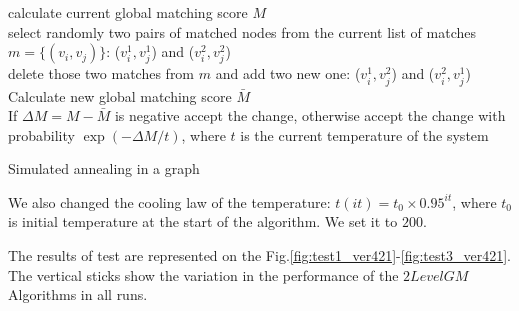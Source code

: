 \documentclass[
	fontsize=12pt,
	paper=a4,
	twoside=false,
	numbers=noenddot,
	plainheadsepline,
	toc=listof,
	toc=bibliography
]{scrartcl}
\begin{document}
\vspace{10pt}
\begin{algorithm}[H]
	\nl calculate current global matching score $M$ \\
	\nl select randomly two pairs of matched nodes from the current list of matches  $m = \{(v_i, v_j)\}$: ($v^1_i, v^1_j$) and
	($v^2_i, v^2_j$) \\
	\nl delete those two matches from $m$ and add two new one: ($v^1_i, v^2_j$) and ($v^2_i, v^1_j$) \\
	\nl Calculate new global matching score $\bar{M}$ \\
	\nl If $\Delta M = M - \bar{M}$ is negative accept the change, otherwise accept the change with probability $\exp(-\Delta M/t)$, where $t$ is the current temperature of the system
	\caption{Simulated annealing in a graph}    \label{alg:SA_inGraph}
\end{algorithm}

We also changed the cooling law of the temperature: $t(it) = t_0\times 0.95^{it}$, where $t_0$ is initial temperature at the start of the algorithm. We set it to $200$.  

The  results of test are represented on the Fig.\ref{fig:test1_ver421}-\ref{fig:test3_ver421}. The vertical sticks show the variation in the performance of the $2LevelGM$ Algorithms in all runs.
\end{document}
